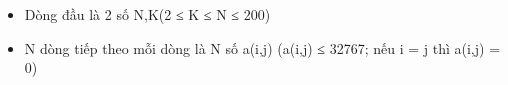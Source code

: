 \begin{itemize}
	\item     Dòng đầu là 2 số N,K(2 ≤ K ≤ N ≤ 200)   
	\item     N dòng tiếp theo mỗi dòng là N số a(i,j) (a(i,j) ≤ 32767; nếu i = j thì a(i,j) = 0)   
\end{itemize}